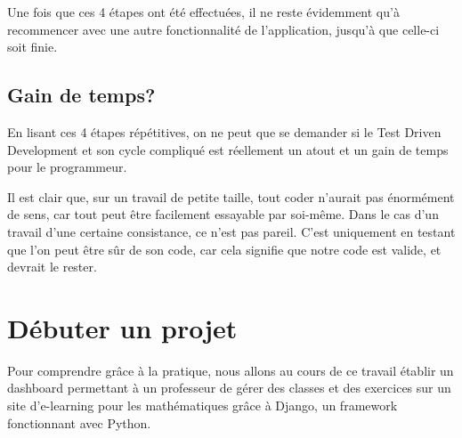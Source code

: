 \documentclass[letterpaper,10pt,french]{sphinxmanual}
\begin{document}
Une fois que ces 4 étapes ont été effectuées, il ne reste évidemment qu'à
recommencer avec une autre fonctionnalité de l'application, jusqu'à
que celle-ci soit finie.


\section{Gain de temps?}
\label{tdd:gain-de-temps}
En lisant ces 4 étapes répétitives, on ne peut que se demander si le Test
Driven Development et son cycle compliqué est réellement un atout et un gain
de temps pour le programmeur.

Il est clair que, sur un travail de petite taille, tout coder n'aurait pas
énormément de sens, car tout peut être facilement essayable par soi-même.
Dans le cas d'un travail d'une certaine consistance, ce n'est pas pareil.
C'est uniquement en testant que l'on peut être sûr de son code, car cela
signifie que notre code est valide, et devrait le rester.


\chapter{Débuter un projet}
\label{projet1:debuter-un-projet}\label{projet1::doc}
Pour comprendre grâce à la pratique, nous allons au cours de ce travail établir un dashboard permettant à un
professeur de gérer des classes et des exercices sur un site d'e-learning pour les mathématiques grâce à Django, un framework fonctionnant avec Python.
\end{document}
